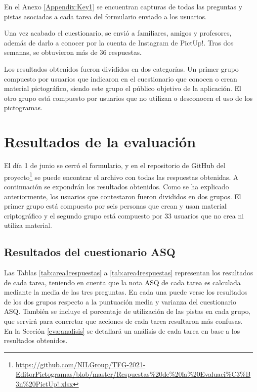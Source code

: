 En el Anexo \ref{Appendix:Key1} se encuentran capturas de todas las preguntas y pistas asociadas a cada tarea del formulario enviado a los usuarios.

Una vez acabado el cuestionario, se envió a familiares, amigos y profesores, además de darlo a conocer por la cuenta de Instagram de PictUp!. Tras dos semanas, se obtuvieron más de 36 respuestas. 

Los resultados obtenidos fueron divididos en dos categorías. Un primer grupo compuesto por usuarios que indicaron en el cuestionario que conocen o crean material pictográfico, siendo este grupo el público objetivo de la aplicación. El otro grupo está compuesto por usuarios que no utilizan o desconocen el uso de los pictogramas.


\section{Resultados de la evaluación}
\label{eva:res}

El día 1 de junio se cerró el formulario, y en el repositorio de GitHub del proyecto\footnote{\url{https://github.com/NILGroup/TFG-2021-EditorPictogramas/blob/master/Respuestas\%20de\%20la\%20Evaluaci\%C3\%B3n\%20PictUp!.xlsx}} se puede encontrar el archivo con todas las respuestas obtenidas. A continuación se expondrán los resultados obtenidos. Como se ha explicado anteriormente, los usuarios que contestaron fueron divididos en dos grupos. El primer grupo está compuesto por seis personas que crean y usan material criptográfico y el segundo grupo está compuesto por  33 usuarios que no crea ni utiliza material. 

\subsection{Resultados del cuestionario ASQ}
Las Tablas \ref{tab:area1respuestas} a \ref{tab:area4respuestas} representan los resultados de cada tarea, teniendo en cuenta que la nota ASQ de cada tarea es calculada mediante la media de las tres preguntas. En cada una puede verse los resultados de los dos grupos respecto a la puntuación media y varianza del cuestionario ASQ. También se incluye el porcentaje de utilización de las pistas en cada grupo, que servirá para concretar que acciones de cada tarea resultaron más confusas. En la Sección \ref{eva:analisis} se detallará un análisis de cada tarea en base a los resultados obtenidos. 


